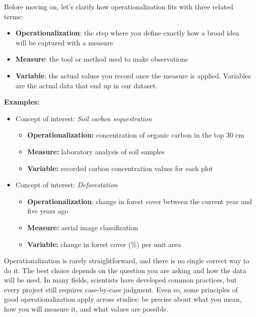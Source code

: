 \documentclass[
  letterpaper,
  DIV=11,
  numbers=noendperiod]{scrreprt}
\providecommand{\tightlist}{%
  \setlength{\itemsep}{0pt}\setlength{\parskip}{0pt}}
\begin{document}
Before moving on, let's clarify how operationalization fits with three
related terms:

\begin{itemize}
\tightlist
\item
  \textbf{Operationalization}: the step where you define exactly how a
  broad idea will be captured with a measure
\item
  \textbf{Measure}: the tool or method used to make observations
\item
  \textbf{Variable}: the actual values you record once the measure is
  applied. Variables are the actual data that end up in our dataset.
\end{itemize}

\textbf{Examples:}

\begin{itemize}
\tightlist
\item
  Concept of interest: \emph{Soil carbon sequestration}

  \begin{itemize}
  \tightlist
  \item
    \textbf{Operationalization:} concentration of organic carbon in the
    top 30 cm
  \item
    \textbf{Measure:} laboratory analysis of soil samples
  \item
    \textbf{Variable:} recorded carbon concentration values for each
    plot
  \end{itemize}
\item
  Concept of interest: \emph{Deforestation}

  \begin{itemize}
  \tightlist
  \item
    \textbf{Operationalization}: change in forest cover between the
    current year and five years ago
  \item
    \textbf{Measure:} aerial image classification
  \item
    \textbf{Variable:} change in forest cover (\%) per unit area
  \end{itemize}
\end{itemize}

Operationalization is rarely straightforward, and there is no single
correct way to do it. The best choice depends on the question you are
asking and how the data will be used. In many fields, scientists have
developed common practices, but every project still requires
case-by-case judgment. Even so, some principles of good
operationalization apply across studies: be precise about what you mean,
how you will measure it, and what values are possible.
\end{document}
